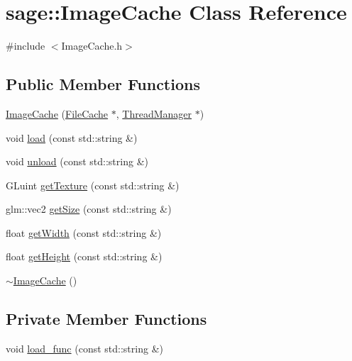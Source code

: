 \hypertarget{classsage_1_1ImageCache}{}\section{sage\+::Image\+Cache Class Reference}
\label{classsage_1_1ImageCache}


{\ttfamily \#include $<$Image\+Cache.\+h$>$}

\subsection*{Public Member Functions}
\begin{DoxyCompactItemize}
\item 
\mbox{\hyperlink{classsage_1_1ImageCache_aa6334522810673df149a290bfbf9da3d}{Image\+Cache}} (\mbox{\hyperlink{classsage_1_1FileCache}{File\+Cache}} $\ast$, \mbox{\hyperlink{classsage_1_1ThreadManager}{Thread\+Manager}} $\ast$)
\item 
void \mbox{\hyperlink{classsage_1_1ImageCache_a8dd56015ff31706f4fedc3d3b85510f4}{load}} (const std\+::string \&)
\item 
void \mbox{\hyperlink{classsage_1_1ImageCache_ad97bd335815c57c59af1c9e5d5a2d9db}{unload}} (const std\+::string \&)
\item 
G\+Luint \mbox{\hyperlink{classsage_1_1ImageCache_a36611ddea849d743f31ad68972946002}{get\+Texture}} (const std\+::string \&)
\item 
glm\+::vec2 \mbox{\hyperlink{classsage_1_1ImageCache_ac81e10d00d95b6d5acdffad8b54bff09}{get\+Size}} (const std\+::string \&)
\item 
float \mbox{\hyperlink{classsage_1_1ImageCache_a62e8ffd461f65df1b8e990dd016e6fe4}{get\+Width}} (const std\+::string \&)
\item 
float \mbox{\hyperlink{classsage_1_1ImageCache_ab3fbe32a2cc379e05fb53a9883e20401}{get\+Height}} (const std\+::string \&)
\item 
\mbox{\hyperlink{classsage_1_1ImageCache_a48e8f9fc5513ee195d209cbec596c093}{$\sim$\+Image\+Cache}} ()
\end{DoxyCompactItemize}
\subsection*{Private Member Functions}
\begin{DoxyCompactItemize}
\item 
void \mbox{\hyperlink{classsage_1_1ImageCache_ae7bd4b346cfe144cc720c6a8457a741f}{load\+\_\+func}} (const std\+::string \&)
\end{DoxyCompactItemize}
